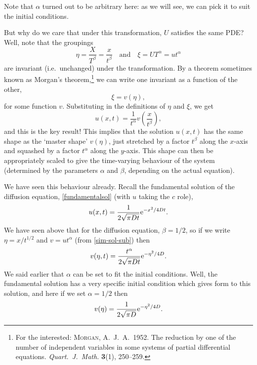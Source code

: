 \documentclass[main.tex]{subfiles}
\begin{document}
Note that $\alpha$ turned out to be arbitrary here: as we will see, we can pick it to suit the initial conditions. 

But why do we care that under this transformation, $U$ satisfies the same PDE? Well, note that the groupings
\begin{equation}
	\eta = \frac{X}{T^\beta} = \frac{x}{t^\beta} \quad \text{and} \quad \xi = UT^\alpha = ut^{\alpha}
	\label{sim-sol-sub}
\end{equation}
are invariant (i.e.\ unchanged) under the transformation. By a theorem sometimes known as Morgan's theorem,\footnote{For the interested: \textsc{Morgan}, A.~J.~A.\ 1952. The reduction by one of the number of independent variables in some systems of partial differential equations. \emph{Quart.\ J.\ Math.} \textbf{3}(1), 250--259.} we can write one invariant as a function of the other,
\begin{equation}
\xi = v(\eta),
\end{equation}
for some function $v$. Substituting in the definitions of $\eta$ and $\xi$, we get
\begin{equation}
u(x,t) = \frac{1}{t^\alpha} v \left( \frac{x}{t^\beta} \right),
\end{equation}
and this is the key result! This implies that the solution $u(x,t)$ has the same shape as the `master shape' $v(\eta)$, just stretched by a factor $t^{\beta}$ along the $x$-axis and squashed by a factor $t^{\alpha}$ along the $y$-axis. This shape can then be appropriately scaled to give the time-varying behaviour of the system (determined by the parameters $\alpha$ and $\beta$, depending on the actual equation).

We have seen this behaviour already. Recall the fundamental solution of the diffusion equation, \cref{fundamentalsol} (with $u$ taking the $c$ role),
\begin{equation}
	u(x,t) =\frac{1}{2 \sqrt{\pi Dt}} \mathrm{e}^{-x^2/4Dt}.
\end{equation}
We have seen above that for the diffusion equation, $\beta=1/2$, so if we write $\eta = x/t^{1/2}$ and $v = ut^{\alpha}$ (from \cref{sim-sol-sub}) then 
\begin{equation}
	v(\eta,t) =\frac{t^{\alpha}}{2\sqrt{\pi D t}} \mathrm{e}^{-\eta^2/4D}.
\end{equation}
We said earlier that $\alpha$ can be set to fit the initial conditions. Well, the fundamental solution has a very specific initial condition which gives form to this solution, and here if we set $\alpha=1/2$ then 
\begin{equation}
v(\eta) =\frac{1}{2 \sqrt{\pi D}}\mathrm{e}^{-\eta^2/4D}.  
\end{equation}
\end{document}
